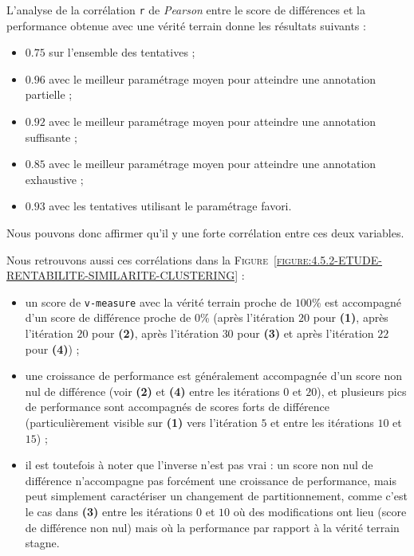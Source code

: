 			L'analyse de la corrélation \texttt{r} de \textit{Pearson} entre le score de différences et la performance obtenue avec une vérité terrain donne les résultats suivants :
			\begin{itemize}
				\item $0.75$ sur l’ensemble des tentatives ;
				\item $0.96$ avec le meilleur paramétrage moyen pour atteindre une annotation partielle ;
				\item $0.92$ avec le meilleur paramétrage moyen pour atteindre une annotation suffisante ;
				\item $0.85$ avec le meilleur paramétrage moyen pour atteindre une annotation exhaustive ;
				\item $0.93$ avec les tentatives utilisant le paramétrage favori.
			\end{itemize}
			Nous pouvons donc affirmer qu'il y une forte corrélation entre ces deux variables.
			
			Nous retrouvons aussi ces corrélations dans la \textsc{Figure~\ref{figure:4.5.2-ETUDE-RENTABILITE-SIMILARITE-CLUSTERING}} :
			\begin{itemize}
				\item un score de \texttt{v-measure} avec la vérité terrain proche de $100$\% est accompagné d'un score de différence proche de $0$\% (après l'itération $20$ pour \textbf{(1)}, après l'itération $20$ pour \textbf{(2)}, après l'itération $30$ pour \textbf{(3)} et après l'itération $22$ pour \textbf{(4)}) ;
				\item une croissance de performance est généralement accompagnée d'un score non nul de différence (voir \textbf{(2)} et \textbf{(4)} entre les itérations $0$ et $20$), et plusieurs pics de performance sont accompagnés de scores forts de différence (particulièrement visible sur \textbf{(1)} vers l'itération $5$ et entre les itérations $10$ et $15$) ;
				\item il est toutefois à noter que l'inverse n'est pas vrai : un score non nul de différence n'accompagne pas forcément une croissance de performance, mais peut simplement caractériser un changement de partitionnement, comme c'est le cas dans \textbf{(3)} entre les itérations $0$ et $10$ où des modifications ont lieu (score de différence non nul) mais où la performance par rapport à la vérité terrain stagne.
			\end{itemize}

